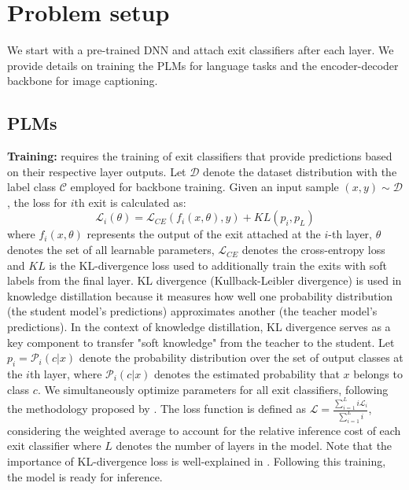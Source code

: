 \section{Problem setup}
We start with a pre-trained DNN and attach exit classifiers after each layer. We provide details on training the PLMs for language tasks and the encoder-decoder backbone for image captioning.

\subsection{PLMs}
\textbf{Training:} \algo{} requires the training of exit classifiers that provide predictions based on their respective layer outputs. Let $\mathcal{D}$ denote the dataset distribution with the label class $\mathcal{C}$ employed for backbone training. Given an input sample $(x, y) \sim \mathcal{D}$, the loss for $i$th exit is calculated as:
\begin{equation}
    \mathcal{L}_i(\theta) = \mathcal{L}_{CE}(f_i(x, \theta), y) +KL(p_i, p_L)
\end{equation}
where $f_i(x, \theta)$ represents the output of the exit attached at the $i$-th layer, $\theta$ denotes the set of all learnable parameters, $\mathcal{L}_{CE}$ denotes the cross-entropy loss and $KL$ is the KL-divergence loss used to additionally train the exits with soft labels from the final layer. KL divergence (Kullback-Leibler divergence) is used in knowledge distillation because it measures how well one probability distribution (the student model's predictions) approximates another (the teacher model's predictions). In the context of knowledge distillation, KL divergence serves as a key component to transfer "soft knowledge" from the teacher to the student. Let $p_i = \mathcal{P}_i(c|x)$ denote the probability distribution over the set of output classes at the $i$th layer, where $\mathcal{P}_i(c|x)$ denotes the estimated probability that $x$ belongs to class $c$. We simultaneously optimize parameters for all exit classifiers, following the methodology proposed by \cite{kaya2019shallow}. The loss function is defined as $\mathcal{L} = \frac{\sum_{i = 1}^{L} i\mathcal{L}_i}{\sum_{i = 1}^{L} i}$, considering the weighted average to account for the relative inference cost of each exit classifier where $L$ denotes the number of layers in the model. Note that the importance of KL-divergence loss is well-explained in \cite{zhu2021leebert}. Following this training, the model is ready for inference.

